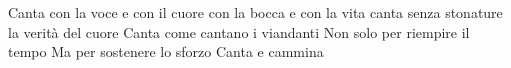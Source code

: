 
\beginverse

Canta con la voce e con il cuore
con la bocca e con la vita
canta senza stonature
la verità del cuore
Canta come cantano i viandanti 
Non solo per riempire il tempo 
Ma per sostenere lo sforzo 
Canta e cammina 

\endverse


\endsong